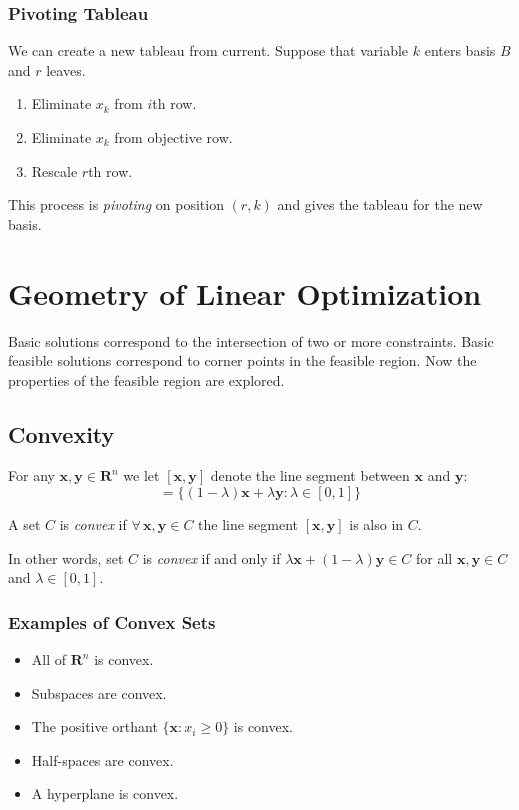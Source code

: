 \subsubsection{Pivoting Tableau}
We can create a new tableau from current. Suppose that variable $k$ enters basis $B$ and $r$ leaves.
\begin{enumerate}
    \item Eliminate $x_k$ from $i$th row.
    \item Eliminate $x_k$ from objective row.
    \item Rescale $r$th row.
\end{enumerate}
This process is \emph{pivoting} on position $(r,k)$ and gives the tableau for the new basis.



\section{Geometry of Linear Optimization}
Basic solutions correspond to the intersection of two or more constraints. Basic feasible solutions correspond to corner points in the feasible region. Now the properties of the feasible region are explored.


\subsection{Convexity}
For any $\mathbf{x,y}\in \mathbf{R}^n$ we let $[\mathbf{x, y}]$ denote the line segment between $\mathbf{x}$ and $\mathbf{y}$:
\begin{equation*}
    [\mathbf{x, y}] = \{(1-\lambda)\mathbf{x} + \lambda \mathbf{y} : \lambda \in [0,1] \}
\end{equation*}

A set $C$ is \emph{convex} if $\forall\, \mathbf{x, y}\in C$ the line segment $[\mathbf{x, y}]$ is also in $C$.

In other words, set $C$ is \emph{convex} if and only if $\lambda\mathbf{x} + (1-\lambda) \mathbf{y} \in C$ for all $\mathbf{x, y}\in C$ and $\lambda \in [0,1]$.

\subsubsection{Examples of Convex Sets}
\begin{itemize}
    \item All of $\mathbf{R}^n$ is convex.
    \item Subspaces are convex.
    \item The positive orthant $\{\mathbf{x}:x_i\geq 0\}$ is convex.
    \item Half-spaces are convex.
    \item A hyperplane is convex.
\end{itemize}


